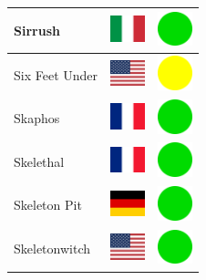 \documentclass[12pt, a4paper, twoside]{report}
\begin{document}
\begin{center}
\begin{longtable}{|p{5cm}|p{2cm}|p{2cm}|}
 Sirrush                                                    & \includegraphics[width=1cm]{../4x3/it} &   \includegraphics[width=1cm]{../likes/y} \\ \hline
 Six Feet Under                                             & \includegraphics[width=1cm]{../4x3/us} &   \includegraphics[width=1cm]{../likes/m} \\ \hline
 Skaphos                                                    & \includegraphics[width=1cm]{../4x3/fr} &   \includegraphics[width=1cm]{../likes/y} \\ \hline
 Skelethal                                                  & \includegraphics[width=1cm]{../4x3/fr} &   \includegraphics[width=1cm]{../likes/y} \\ \hline
 Skeleton Pit                                               & \includegraphics[width=1cm]{../4x3/de} &   \includegraphics[width=1cm]{../likes/y} \\ \hline
 Skeletonwitch                                              & \includegraphics[width=1cm]{../4x3/us} &   \includegraphics[width=1cm]{../likes/y} \\ \hline

\end{longtable}
\end{center}
\end{document}
